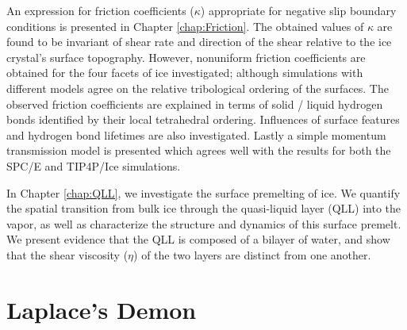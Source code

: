 An expression for friction coefficients ($\kappa$) appropriate for
negative slip boundary conditions is presented in Chapter
\ref{chap:Friction}. The obtained values of $\kappa$ are found to be
invariant of shear rate and direction of the shear relative to the ice
crystal's surface topography. However, nonuniform friction
coefficients are obtained for the four facets of ice investigated;
although simulations with different models agree on the relative
tribological ordering of the surfaces. The observed friction
coefficients are explained in terms of solid / liquid hydrogen bonds
identified by their local tetrahedral ordering. Influences of surface
features and hydrogen bond lifetimes are also investigated. Lastly a
simple momentum transmission model is presented which agrees well with
the results for both the SPC/E and TIP4P/Ice simulations.

In Chapter \ref{chap:QLL}, we investigate the surface premelting of
ice. We quantify the spatial transition from bulk ice through the
quasi-liquid layer (QLL) into the vapor, as well as characterize the
structure and dynamics of this surface premelt. We present evidence
that the QLL is composed of a bilayer of water, and show that the
shear viscosity ($\eta$) of the two layers are distinct from one
another.

\section{Laplace's Demon}





